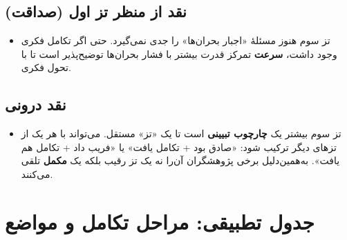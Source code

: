 \documentclass[12pt,a4paper]{book}
\newcommand{\keyword}[1]{\textbf{\textcolor{cPrimary}{#1}}}
\begin{document}
\subsection{نقد از منظر تز اول (صداقت)}

\begin{itemize}[label=\textcolor{cGreen}{$\times$}, rightmargin=2em]
    \item تز سوم هنوز مسئلهٔ «اجبار بحران‌ها» را جدی نمی‌گیرد. حتی اگر تکامل فکری وجود داشت، \keyword{سرعت} تمرکز قدرت بیشتر با فشار بحران‌ها توضیح‌پذیر است تا با تحول فکری.
\end{itemize}

\subsection{نقد درونی}

\begin{itemize}[label=\textcolor{cGold}{$\times$}, rightmargin=2em]
    \item تز سوم بیشتر یک \keyword{چارچوب تبیینی} است تا یک «تز» مستقل. می‌تواند با هر یک از تزهای دیگر ترکیب شود: «صادق بود + تکامل یافت» یا «فریب داد + تکامل هم یافت». به‌همین‌دلیل برخی پژوهشگران آن‌را نه یک تز رقیب بلکه یک \keyword{مکمل} تلقی می‌کنند.
\end{itemize}

\section{جدول تطبیقی: مراحل تکامل و مواضع}
\end{document}
